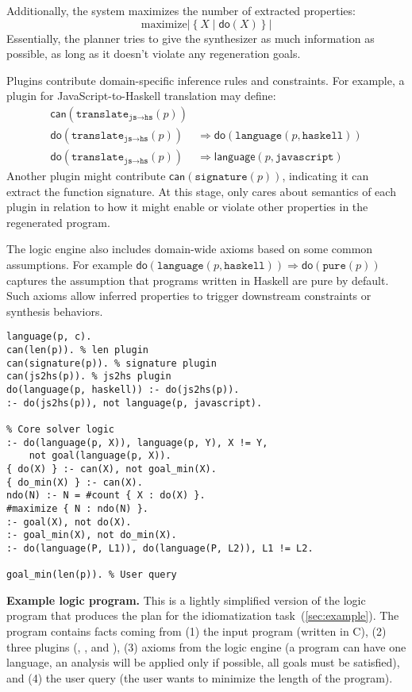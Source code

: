 \documentclass[a4paper,twoside,12pt]{report} %
\begin{document}
Additionally, the system maximizes the number of extracted properties:
\[
\text{maximize} \left|\left\{ X \mid \mathsf{do}(X) \right\}\right|
\]
Essentially, the planner tries to give the synthesizer as much information
as possible, as long as it doesn't violate any regeneration goals.

Plugins contribute domain-specific inference rules and constraints. For example, a plugin for JavaScript-to-Haskell translation may define:
\begin{align*}
\mathsf{can}(\texttt{translate}_{\texttt{js} \rightarrow \texttt{hs}}(p)) & \\
\mathsf{do}(\texttt{translate}_{\texttt{js} \rightarrow \texttt{hs}}(p)) &\Rightarrow \mathsf{do}(\texttt{language}(p, \texttt{haskell})) \\
\mathsf{do}(\texttt{translate}_{\texttt{js} \rightarrow \texttt{hs}}(p)) &\Rightarrow \mathsf{language}(p, \texttt{javascript})
\end{align*}
Another plugin might contribute $\mathsf{can}(\texttt{signature}(p))$, indicating it can extract the function signature. At this stage, \sys only cares about semantics of each plugin in relation to how it might enable or violate 
other properties in the regenerated program.

The logic engine also includes domain-wide axioms based on some common assumptions.
For example
$\mathsf{do}(\texttt{language}(p, \texttt{haskell})) \Rightarrow \mathsf{do}(\texttt{pure}(p))$
captures the assumption that programs written in Haskell are pure by default.
Such axioms allow inferred properties to trigger downstream constraints or synthesis behaviors.

\begin{listing}
  \begin{verbatim}
language(p, c).
can(len(p)). % len plugin
can(signature(p)). % signature plugin
can(js2hs(p)). % js2hs plugin
do(language(p, haskell)) :- do(js2hs(p)).
:- do(js2hs(p)), not language(p, javascript).

% Core solver logic
:- do(language(p, X)), language(p, Y), X != Y,
    not goal(language(p, X)).
{ do(X) } :- can(X), not goal_min(X).
{ do_min(X) } :- can(X).
ndo(N) :- N = #count { X : do(X) }.
#maximize { N : ndo(N) }.
:- goal(X), not do(X).
:- goal_min(X), not do_min(X).
:- do(language(P, L1)), do(language(P, L2)), L1 != L2.

goal_min(len(p)). % User query
\end{verbatim}
  \caption{\textbf{Example \sys logic program.}
  This is a lightly simplified version of the logic program that produces the plan for the idiomatization task~(\cref{sec:example}). 
  The program contains facts coming from (1) the input program (written in C),
  (2) three plugins (, , and ),
  (3) axioms from the logic engine (\eg a program can have one language, an analysis will be applied only if possible, all goals must be satisfied), and
  (4) the user query (the user wants to minimize the length of the program).
  }
  \label{lst:logic-example}
\end{listing}
\end{document}
